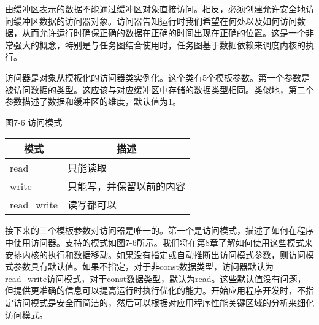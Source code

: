 由缓冲区表示的数据不能通过缓冲区对象直接访问。相反，必须创建允许安全地访问缓冲区数据的访问器对象。访问器告知运行时我们希望在何处以及如何访问数据，从而允许运行时确保正确的数据在正确的时间出现在正确的位置。这是一个非常强大的概念，特别是与任务图结合使用时，任务图基于数据依赖来调度内核的执行。\par

访问器是对象从模板化的访问器类实例化。这个类有5个模板参数。第一个参数是被访问数据的类型。这应该与对应缓冲区中存储的数据类型相同。类似地，第二个参数描述了数据和缓冲区的维度，默认值为1。\par

\hspace*{\fill} \par %
图7-6 访问模式
\begin{table}[H]
	\begin{tabular}{|l|l|}
		\hline
		\multicolumn{1}{|c|}{模式} & \multicolumn{1}{c|}{描述}               \\ \hline
		read                       & 只能读取                               \\ \hline
		write                      & 只能写，并保留以前的内容 \\ \hline
		read\_write                & 读写都可以                          \\ \hline
	\end{tabular}
\end{table}

接下来的三个模板参数对访问器是唯一的。第一个是访问模式，描述了如何在程序中使用访问器。支持的模式如图7-6所示。我们将在第8章了解如何使用这些模式来安排内核的执行和数据移动。如果没有指定或自动推断出访问模式参数，则访问模式参数具有默认值。如果不指定，对于非const数据类型，访问器默认为read\_write访问模式，对于const数据类型，默认为read。这些默认值没有问题，但提供更准确的信息可以提高运行时执行优化的能力。开始应用程序开发时，不指定访问模式是安全而简洁的，然后可以根据对应用程序性能关键区域的分析来细化访问模式。\par

